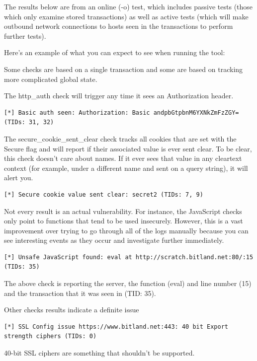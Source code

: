 \documentclass{article}
\begin{document}
The results below are from an online (-o) test, which includes passive tests (those
which only examine stored transactions) as well as active tests (which will make outbound
network connections to hosts seen in the transactions to perform further tests).  

Here's an example of what you can expect to see when running the tool:


Some checks are based on a single transaction and some are based on tracking more
complicated global state.

The http\_auth check will trigger any time it sees an Authorization header.
\begin{lstlisting}[style=output]
[*] Basic auth seen: Authorization: Basic andpbGtpbnM6YXNkZmFzZGY= (TIDs: 31, 32)
\end{lstlisting}

The secure\_cookie\_sent\_clear check tracks all cookies that are set with the
Secure flag and will report if their associated value is ever sent clear.  To 
be clear, this check doesn't care about names.  If it ever sees that value in any
cleartext context (for example, under a different name and sent on a query string), 
it will alert you.
\begin{lstlisting}[style=output]
[*] Secure cookie value sent clear: secret2 (TIDs: 7, 9)
\end{lstlisting}

Not every result is an actual vulnerability.  For instance, the JavaScript checks
only point to functions that tend to be used insecurely.  However, this is a 
vast improvement over trying to go through all of the logs manually because you
can see interesting events as they occur and investigate further immediately.

\begin{lstlisting}[style=output]
[*] Unsafe JavaScript found: eval at http://scratch.bitland.net:80/:15 (TIDs: 35)
\end{lstlisting}
The above check is reporting the server, the function (eval) and line number (15) and the
transaction that it was seen in (TID: 35).

Other checks results indicate a definite issue
\begin{lstlisting}[style=output]
[*] SSL Config issue https://www.bitland.net:443: 40 bit Export strength ciphers (TIDs: 0)
\end{lstlisting}
40-bit SSL ciphers are something that shouldn't be supported.
\end{document}
